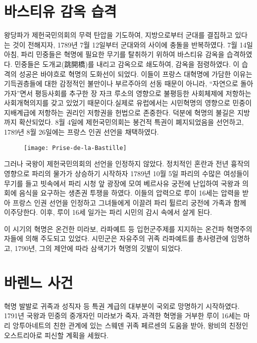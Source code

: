 \section{바스티유 감옥 습격}
왕당파가 제헌국민의회의 무력 탄압을 기도하여, 지방으로부터 군대를 결집하고 있다는 것이 전해지자, 1789년 7월 12일부터 군대와의 사이에 충돌을 반복하였다. 7월 14일 아침, 파리 민중들은 혁명에 필요한 무기를 탈취하기 위하여 바스티유 감옥을 습격하였다. 민중들은 도개교(跳開橋)를 내리고 감옥으로 쇄도하여, 감옥을 점령하였다. 이 습격의 성공은 바야흐로 혁명의 도화선이 되었다. 이들이 프랑스 대혁명에 가담한 이유는 기득권층들에 대한 감정적인 불만이나 부르주아의 선동 때문이 아니라, ``자연으로 돌아가자''면서 평등사회를 추구한 장 자크 루소의 영향으로 불평등한 사회체제에 저항하는 사회개혁의지를 갖고 있었기 때문이다.실제로 유럽에서는 시민혁명의 영향으로 민중이 지배계급에 저항하는 권리인 저항권을 헌법으로 존중한다. 덕분에 혁명의 불길은 지방까지 확산되었다. 8월 4일에 제헌국민의회는 봉건적 특권이 폐지되었음을 선언하고, 1789년 8월 26일에는 프랑스 인권 선언을 채택하였다.

\begin{figure}
\texttt{[image: Prise-de-la-Bastille]}
\end{figure}

그러나 국왕이 제헌국민의회의 선언을 인정하지 않았다. 정치적인 혼란과 전년 흉작의 영향으로 파리의 물가가 상승하기 시작하자 1789년 10월 5일 파리의 수많은 여성들이 무기를 들고 빗속에서 파리 시청 앞 광장에 모여 베르사유 궁전에 난입하여 국왕과 의회에 음식을 요구하는 생존권 투쟁을 하였다. 이들의 압력으로 루이 16세는 압력을 받아 프랑스 인권 선언을 인정하고 그녀들에게 이끌려 파리 튈르리 궁전에 가족과 함께 이주당한다. 이후, 루이 16세 일가는 파리 시민의 감시 속에서 살게 된다.

이 시기의 혁명은 온건한 미라보, 라파예트 등 입헌군주제를 지지하는 온건파 혁명주의자들에 의해 주도되고 있었다. 시민군은 자유주의 귀족 라파예트를 총사령관에 임명하고, 1790년, 그의 제안에 따라 삼색기가 혁명의 깃발이 되었다.

\section{바렌느 사건}
혁명 발발로 귀족과 성직자 등 특권 계급의 대부분이 국외로 망명하기 시작하였다. 1791년 국왕과 민중의 중개자인 미라보가 죽자, 과격한 혁명을 거부한 루이 16세는 마리 앙투아네트의 친한 관계에 있는 스웨덴 귀족 페르센의 도움을 받아, 왕비의 친정인 오스트리아로 피신할 계획을 세웠다.


